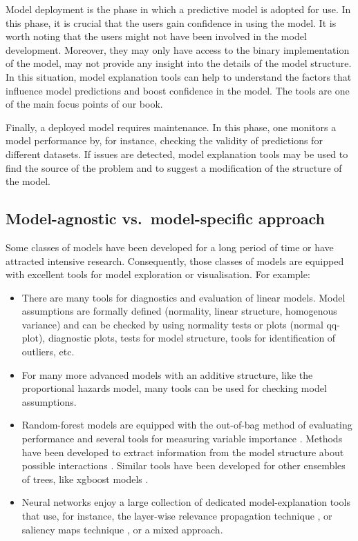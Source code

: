 \documentclass[12pt,]{krantz}
\providecommand{\tightlist}{%
  \setlength{\itemsep}{0pt}\setlength{\parskip}{0pt}}
\begin{document}
Model deployment is the phase in which a predictive model is adopted for use. In this phase, it is crucial that the users gain confidence in using the model. It is worth noting that the users might not have been involved in the model development. Moreover, they may only have access to the binary implementation of the model, may not provide any insight into the details of the model structure. In this situation, model explanation tools can help to understand the factors that influence model predictions and boost confidence in the model. The tools are one of the main focus points of our book.

Finally, a deployed model requires maintenance. In this phase, one monitors a model performance by, for instance, checking the validity of predictions for different datasets. If issues are detected, model explanation tools may be used to find the source of the problem and to suggest a modification of the structure of the model.

\hypertarget{model-agnostic-vs.model-specific-approach}{%
\subsection{Model-agnostic vs.~model-specific approach}\label{model-agnostic-vs.model-specific-approach}}

Some classes of models have been developed for a long period of time or have attracted intensive research. Consequently, those classes of models are equipped with excellent tools for model exploration or visualisation. For example:

\begin{itemize}
\tightlist
\item
  There are many tools for diagnostics and evaluation of linear models. Model assumptions are formally defined (normality, linear structure, homogenous variance) and can be checked by using normality tests or plots (normal qq-plot), diagnostic plots, tests for model structure, tools for identification of outliers, etc.
\item
  For many more advanced models with an additive structure, like the proportional hazards model, many tools can be used for checking model assumptions.
\item
  Random-forest models are equipped with the out-of-bag method of evaluating performance and several tools for measuring variable importance \citep{R-randomForest}. Methods have been developed to extract information from the model structure about possible interactions \citep{R-randomForestExplainer}. Similar tools have been developed for other ensembles of trees, like xgboost models \citep{R-xgboostExplainer}.
\item
  Neural networks enjoy a large collection of dedicated model-explanation tools that use, for instance, the layer-wise relevance propagation technique \citep{BachLWRP}, or saliency maps technique \citep{SaliencyMaps}, or a mixed approach.
\end{itemize}
\end{document}
